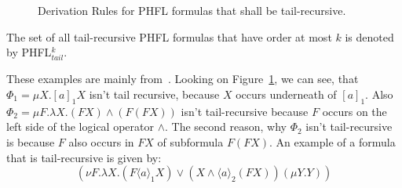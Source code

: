 \begin{figure}
    \caption{Derivation Rules for PHFL formulas that shall be tail-recursive.}
    \label{figure:phfl-tail-recursive}
\end{figure}

The set of all tail-recursive PHFL formulas that have order at most $k$ is denoted by PHFL$^k_{tail}$.

\begin{example}
    These examples are mainly from~\cite{lange2014capturing}. Looking on Figure~\ref{figure:phfl-tail-recursive}, we can
    see, that $\Phi_1 = \mu X.[a]_1 X$ isn't tail recursive, because $X$ occurs underneath of $[a]_1$. Also $\Phi_2 =
    \mu F .\lambda X. (F X) \wedge (F(F X))$ isn't tail-recursive because $F$ occurs on the left side of the logical
    operator $\wedge$. The second reason, why $\Phi_2$ isn't tail-recursive is because $F$ also occurs in $F X$ of
    subformula $F (F X)$. An example of a formula that is tail-recursive is given by:
    \[(\nu F. \lambda X. (F \langle a \rangle_1 X) \vee (X \wedge \langle a \rangle_2 (F X)) (\mu Y.Y))\]
\end{example}